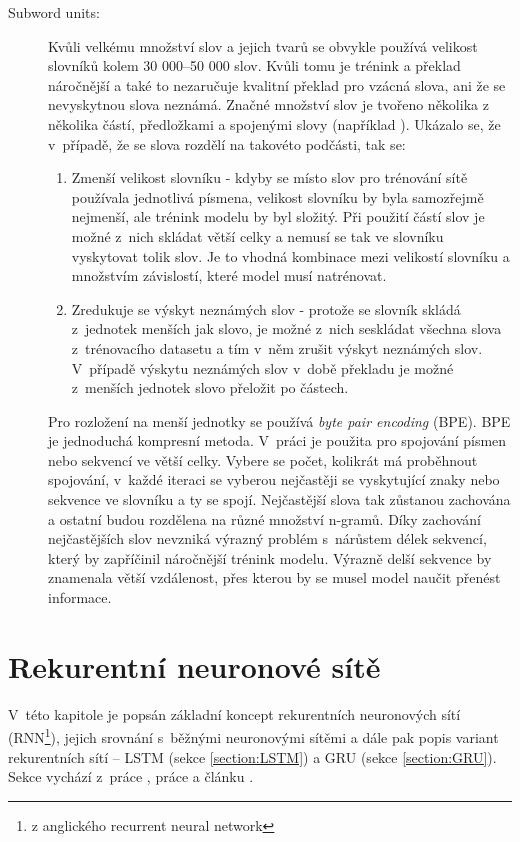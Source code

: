 \begin{description}
  \item[Subword units:]\label{subsection:subwords} Kvůli velkému množství slov a jejich tvarů se obvykle používá velikost slovníků kolem 30 000--50 000 slov. Kvůli tomu je trénink a překlad náročnější a také to nezaručuje kvalitní překlad pro vzácná slova, ani že se nevyskytnou slova neznámá. Značné množství slov je tvořeno několika z několika částí, předložkami a spojenými slovy (například ). Ukázalo se, že v~případě, že se slova rozdělí na takovéto podčásti, tak se:

      \begin{enumerate}
        \item Zmenší velikost slovníku - kdyby se místo slov pro trénování sítě používala jednotlivá písmena, velikost slovníku by byla samozřejmě nejmenší, ale trénink modelu by byl složitý. Při použití částí slov je možné z~nich skládat větší celky a nemusí se tak ve slovníku vyskytovat tolik slov. Je to vhodná kombinace mezi velikostí slovníku a množstvím závislostí, které model musí natrénovat.
        \item Zredukuje se výskyt neznámých slov - protože se slovník skládá z~jednotek menších jak slovo, je možné z~nich seskládat všechna slova z~trénovacího datasetu a tím v~něm zrušit výskyt neznámých slov. V~případě výskytu neznámých slov v~době překladu je možné z~menších jednotek slovo přeložit po částech.
      \end{enumerate}

      Pro rozložení na menší jednotky se používá \emph{byte pair encoding} (BPE). BPE je jednoduchá kompresní metoda. V~práci \cite{subwords} je použita pro spojování písmen nebo sekvencí ve větší celky. Vybere se počet, kolikrát má proběhnout spojování, v~každé iteraci se vyberou nejčastěji se vyskytující znaky nebo sekvence ve slovníku a ty se spojí. Nejčastější slova tak zůstanou zachována a ostatní budou rozdělena na různé množství n-gramů. Díky zachování nejčastějších slov nevzniká výrazný problém s~nárůstem délek sekvencí, který by zapříčinil náročnější trénink modelu. Výrazně delší sekvence by znamenala větší vzdálenost, přes kterou by se musel model naučit přenést informace.
\end{description}

\section{Rekurentní neuronové sítě}\label{section:rnn}
V~této kapitole je popsán základní koncept rekurentních neuronových sítí (RNN\footnote{z anglického recurrent neural network}), jejich srovnání s~běžnými neuronovými sítěmi a dále pak popis variant rekurentních sítí -- LSTM (sekce \ref{section:LSTM}) a GRU (sekce \ref{section:GRU}). Sekce vychází z~práce \cite{nmtThesis}, práce \cite{nmtTutorial} a článku \cite{understandingLSTM}.


